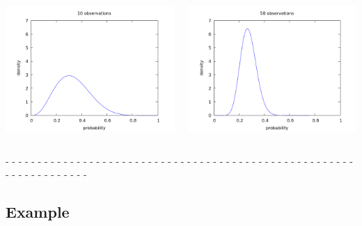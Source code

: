 \documentclass[aspectratio=169]{beamer}
\begin{document}
\begin{frame}
\begin{columns}
    \column{1.65in}
    \includegraphics[scale=0.2]{images/observations_10.png}  

    \column{1.65in}
    \includegraphics[scale=0.2]{images/observations_50.png}  
  \end{columns}

  - - - - - - - - - - - - - - - - - - - - - - - - - - - - - - - - - -
  - - - - - - - - - - - - - - - - - - - - - - - - - - - - - - - - -\\[0.1cm]

\end{frame}

\subsection{Example}
\end{document}
